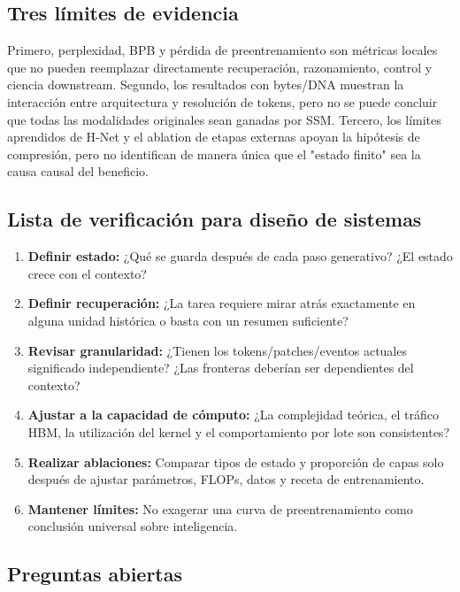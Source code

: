 \documentclass[a4paper]{article}
\begin{document}
\subsection{Tres límites de evidencia}

Primero, perplexidad, BPB y pérdida de preentrenamiento son métricas locales que no pueden reemplazar directamente recuperación, razonamiento, control y ciencia downstream. Segundo, los resultados con bytes/DNA muestran la interacción entre arquitectura y resolución de tokens, pero no se puede concluir que todas las modalidades originales sean ganadas por SSM. Tercero, los límites aprendidos de H-Net y el ablation de etapas externas apoyan la hipótesis de compresión, pero no identifican de manera única que el "estado finito" sea la causa causal del beneficio.

\subsection{Lista de verificación para diseño de sistemas}

\begin{enumerate}
  \item \textbf{Definir estado:} ¿Qué se guarda después de cada paso generativo? ¿El estado crece con el contexto?
  \item \textbf{Definir recuperación:} ¿La tarea requiere mirar atrás exactamente en alguna unidad histórica o basta con un resumen suficiente?
  \item \textbf{Revisar granularidad:} ¿Tienen los tokens/patches/eventos actuales significado independiente? ¿Las fronteras deberían ser dependientes del contexto?
  \item \textbf{Ajustar a la capacidad de cómputo:} ¿La complejidad teórica, el tráfico HBM, la utilización del kernel y el comportamiento por lote son consistentes?
  \item \textbf{Realizar ablaciones:} Comparar tipos de estado y proporción de capas solo después de ajustar parámetros, FLOPs, datos y receta de entrenamiento.
  \item \textbf{Mantener límites:} No exagerar una curva de preentrenamiento como conclusión universal sobre inteligencia.
\end{enumerate}

\subsection{Preguntas abiertas}
\end{document}
